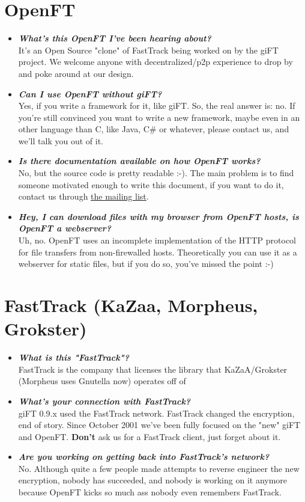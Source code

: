\documentclass[10pt]{article}
\newcommand{\question}[1]{\item\textbf{\emph{#1}}}
\begin{document}
\section{OpenFT}
\begin{itemize}

\question {What's this OpenFT I've been hearing about?}\\
It's an Open Source "clone" of FastTrack being worked on by the
giFT project. We welcome anyone with decentralized/p2p experience
to drop by and poke around at our design.

\question {Can I use OpenFT without giFT?}\\
Yes, if you write a framework for it, like giFT. So, the real
answer is: no. If you're still convinced you want to write a new
framework, maybe even in an other language than C, like Java, C\#
or whatever, please contact us, and we'll talk you out of it.

\question {Is there documentation available on how OpenFT works?}\\
No, but the source code is pretty readable :-). The main problem
is to find someone motivated enough to write this document, if you
want to do it, contact us through 
\href{http://lists.sourceforge.net/lists/listinfo/gift-openft}{the
mailing list}.

\question {Hey, I can download files with my browser from OpenFT
hosts, is OpenFT a webserver?}\\
Uh, no. OpenFT uses an incomplete implementation of the HTTP
protocol for file transfers from non-firewalled hosts.
Theoretically you can use it as a webserver for static files, but
if you do so, you've missed the point :-)


\end{itemize}

\section{FastTrack (KaZaa, Morpheus, Grokster)}
\begin{itemize}

\question {What is this "FastTrack"?}\\
FastTrack is the company that licenses the library that
KaZaA/Grokster (Morpheus uses Gnutella now) operates off of

\question {What's your connection with FastTrack?}\\
giFT 0.9.x used the FastTrack network. FastTrack changed the
encryption, end of story. Since October 2001 we've been fully
focused on the "new" giFT and OpenFT. \textbf{Don't} ask us for a
FastTrack client, just forget about it.

\question {Are you working on getting back into FastTrack's network?}\\
No. Although quite a few people made attempts to reverse engineer
the new encryption, nobody has succeeded, and nobody is working on
it anymore because OpenFT kicks so much ass nobody even remembers
FastTrack.

\end{itemize}
\end{document}
